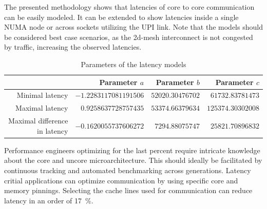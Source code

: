 The presented methodology shows that latencies of core to core communication can be easily modeled.
It can be extended to show latencies inside a single NUMA node or across sockets utilizing the UPI link.
Note that the models should be considered best case scenarios, as the 2d-mesh interconnect is not congested by traffic, increasing the observed latencies.

\begin{table}[t]
	\centering
	\caption{\label{tab:latency_model_parameters}Parameters of the latency models}
	\begin{tabular}{rrrr}
		 & Parameter $a$ & Parameter $b$ & Parameter $c$ \\
		\toprule
		\rowcolor[HTML]{EFEFEF}Minimal latency & $-1.2283117081191506$ & $52020.30476702$ & $61732.83781473$ \\
		Maximal latency & $0.9258637728757435$ & $53374.66379634$ & $125374.30302008$ \\
		\rowcolor[HTML]{EFEFEF}Maximal difference in latency & $-0.1620055737606272$ & $7294.88075747$ & $25821.70896832$ \\
		\bottomrule
	\end{tabular}
\end{table}


Performance engineers optimizing for the last percent require intricate knowledge about the core and uncore microarchitecture.
This should ideally be facilitated by continuous tracking and automated benchmarking across generations.
Latency critial applications can optimize communication by using specific core and memory pinnings.
Selecting the cache lines used for communication can reduce latency in an order of \SI{17}{\percent}.